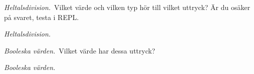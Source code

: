 \QUESTEND




\def\what{\emph{Heltalsdivision.}}

\QUESTBEGIN

\Task \what~Vilket värde och vilken typ hör till vilket uttryck?  Är du osäker på svaret, testa i REPL.

\begin{ConceptConnections}[0.3\textwidth]

\end{ConceptConnections}

\SOLUTION

\TaskSolved \what

\begin{ConceptConnections}[0.3\textwidth]

\end{ConceptConnections}

\QUESTEND





\def\what{\emph{Booleska värden.}}

\QUESTBEGIN

\Task \what~Vilket värde har dessa uttryck?  %

\Subtask {}

\Subtask {}

\Subtask {}

\Subtask {}

\Subtask {}

\Subtask {}

\Subtask {}

\Subtask {}

\Subtask {}

\Subtask {}

\SOLUTION

\TaskSolved \what

\SubtaskSolved {}

\SubtaskSolved {}

\SubtaskSolved {}

\SubtaskSolved {}

\SubtaskSolved {}

\SubtaskSolved {}

\SubtaskSolved {}

